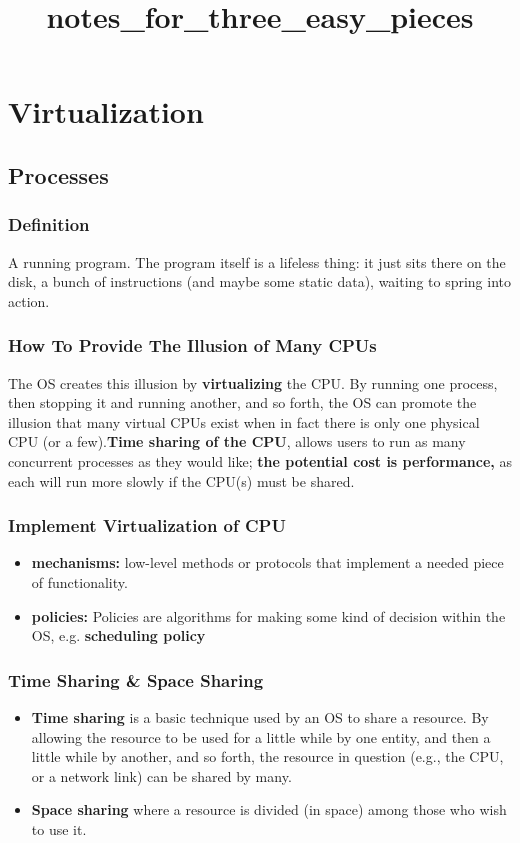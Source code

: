 \documentclass{article}
\title{notes\_for\_three\_easy\_pieces}
\begin{document}
\maketitle
\tableofcontents
\pagebreak

\section{Virtualization}
\subsection{Processes}
\subsubsection{Definition}
A running program. The program
itself is a lifeless thing: it just sits there on the disk, a bunch of instructions
(and maybe some static data), waiting to spring into action.

\subsubsection{How To Provide The Illusion of Many CPUs}
The OS creates this illusion by \textbf{\color{red}virtualizing} the CPU. By running one
process, then stopping it and running another, and so forth, the OS can
promote the illusion that many virtual CPUs exist when in fact there is
only one physical CPU (or a few).\textbf{\color{red}Time
sharing of the CPU}, allows users to run as many concurrent processes as
they would like; \textbf{\color{red}the potential cost is performance,} as each will run more
slowly if the CPU(s) must be shared.
\subsubsection{Implement Virtualization of CPU}
\begin{itemize}
    \item \textbf{mechanisms: }low-level methods or protocols that implement a needed piece of functionality.
    \item \textbf{policies: }Policies are algorithms for making some kind of decision within the OS, e.g. \textbf{scheduling policy}
\end{itemize}

\subsubsection{Time Sharing \& Space Sharing}
\begin{itemize}
    \item \textbf{Time sharing} is a basic technique used by an OS to share a resource. By allowing the resource to be used for a little while by one entity, and then a little while by another, and so forth, the resource in question (e.g., the CPU, or a network link) can be shared by many.
    \item \textbf{Space sharing} where a resource is divided (in space) among those who wish to use it.
\end{itemize}
\end{document}

